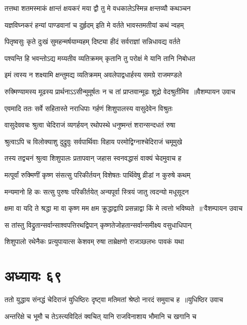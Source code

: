 \twolineshloka
{तत्तथा शतमस्माकं क्षान्तं क्षयकरं मया}
{द्वौ तु मे वधकालेऽस्मिन्न क्षन्तव्यौ कथञ्चन}


\twolineshloka
{यज्ञविघ्नकरं हन्यां पाण्डवानां च दुर्हृदम्}
{इति मे वर्तते भावस्तमतीयां कथं न्वहम्}


\twolineshloka
{पितृष्वसुः कृते दुःखं सुमहन्मर्षयाम्यहम्}
{दिष्ट्या हीदं सर्वराज्ञां सन्निधावद्य वर्तते}


\twolineshloka
{पश्यन्ति हि भवन्तोऽद्य मय्यतीव व्यतिक्रमम्}
{कृतानि तु परोक्षं मे यानि तानि निबोधत}


\twolineshloka
{इमं त्वस्य न शक्ष्यामि क्षन्तुमद्य व्यतिक्रमम्}
{अवलेपाद्वधार्हस्य समग्रे राजमण्डले}


\twolineshloka
{रुक्मिण्यामस्य मूढस्य प्रार्थनाऽऽसीन्मुमूर्षतः}
{न च तां प्राप्तवान्मूढः शूद्रो वेदश्रुतीमिव ॥वैशम्पायन उवाच}


\twolineshloka
{एवमादि ततः सर्वे सहितास्ते नराधिपाः}
{गर्हणं शिशुपालस्य वासुदेवेन विश्रुतः}


\twolineshloka
{वासुदेववचः श्रुत्वा चेदिराजं व्यगर्हयन्}
{रथोपस्थे धनुष्मन्तं शरान्सन्दधतं रुषा}


\twolineshloka
{श्रुत्वाऽपि च विलोक्याशु दुद्रुवुः सर्वपार्थिवाः}
{विहाय परमोद्विग्नाश्चेदिराजं चमूमुखे}


\twolineshloka
{तस्य तद्वचनं श्रुत्वा शिशुपालः प्रतापवान्}
{जहास स्वनवद्धासं वाक्यं चेदमुवाच ह}


\twolineshloka
{मत्पूर्वां रुक्मिणीं कृष्ण संसत्सु परिकीर्तयन्}
{विशेषतः पार्थिवेषु व्रीडां न कुरुषे कथम्}


\twolineshloka
{मन्यमानो हि कः सत्सु पुरुषः परिकीर्तयेत्}
{अन्यपूर्वा स्त्रियं जातु त्वदन्यो मधूसूदन}


\twolineshloka
{क्षमा वा यदि ते श्रद्धा मा वा कृष्ण मम क्षम}
{क्रुद्धाद्वापि प्रसन्नाद्वा किं मे त्वत्तो भविष्यते ॥`वैशम्पायन उवाच}


\twolineshloka
{स तांस्तु विद्रुतान्सर्वान्साश्वपत्तिरथद्विपान्}
{कृष्णतेजोहतान्सर्वान्समीक्ष्य वसुधाधिपान्}


\twolineshloka
{शिशुपालो रथेनैकः प्रत्युपायात्स केशवम्}
{रुषा ताम्रेक्षणो राजञ्छलभः पावकं यथा}


\chapter{अध्यायः ६९}
\twolineshloka
{ततो युद्धाय संनद्धं चेदिराजं युधिष्ठिरः}
{दृष्ट्वा मतिमतां श्रेष्ठो नारदं समुवाच ह ॥युधिष्ठिर उवाच}


\twolineshloka
{अन्तरिक्षे च भूमौ च तेऽस्त्यविदितं क्वचित्}
{यानि राजविनाशाय भौमानि च खगानि च}


